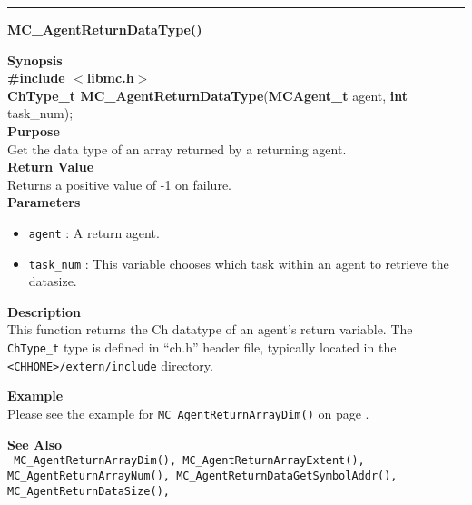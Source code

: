 \noindent
\vspace{5pt}
\rule{6.5in}{0.015in}
\noindent
{}
{\LARGE \bf MC\_AgentReturnDataType()}\\
\label{api:MC_AgentReturnDataType()}

\noindent
{\bf Synopsis}\\
{\bf \#include $<$libmc.h$>$}\\
{\bf ChType\_t MC\_AgentReturnDataType}({\bf MCAgent\_t} agent, {\bf int} task\_num);\\

\noindent
{\bf Purpose}\\
Get the data type of an array returned by a returning agent.\\

\noindent
{\bf Return Value}\\
Returns a positive value of -1 on failure.\\

\noindent
{\bf Parameters}
\begin{itemize}
\item \texttt{agent} : A return agent.
\item \texttt{task\_num} : This variable chooses which task within an agent to
retrieve the datasize.
\end{itemize}


\noindent
{\bf Description}\\
This function returns the Ch datatype of an agent's return variable. The
\texttt{ChType\_t} type is defined in ``ch.h'' header file, typically
located in the \texttt{<CHHOME>/extern/include} directory.

\noindent
{\bf Example}\\
\noindent
Please see the example for \texttt{MC\_AgentReturnArrayDim()} on page \pageref{api:MC_AgentReturnArrayDim()}.

\noindent
{\bf See Also}\\
\texttt{
  MC\_AgentReturnArrayDim(), MC\_AgentReturnArrayExtent(), MC\_AgentReturnArrayNum(),
  MC\_AgentReturnDataGetSymbolAddr(), MC\_AgentReturnDataSize(),
}

